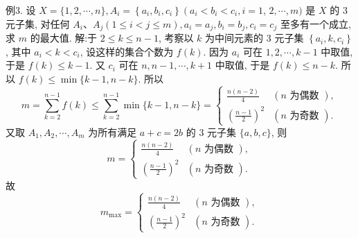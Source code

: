 例3. 设 $X=\{1,2, \cdots, n\}, A_i=\left\{a_i, b_i, c_i\right\}\left(a_i<b_i<c_i, i=1\right.$, $2, \cdots, m)$ 是 $X$ 的 3 元子集, 对任何 $A_i 、 A_j(1 \leqslant i<j \leqslant m), a_i=a_j, b_i= b_j, c_i=c_j$ 至多有一个成立, 求 $m$ 的最大值.
解:于 $2 \leqslant k \leqslant n-1$, 考察以 $k$ 为中间元素的 3 元子集 $\left\{a_i, k, c_i\right\}$, 其中 $a_i<k<c_i$, 设这样的集合个数为 $f(k)$. 因为 $a_i$ 可在 $1,2, \cdots, k-1$ 中取值, 于是 $f(k) \leqslant k-1$. 又 $c_i$ 可在 $n, n-1, \cdots, k+1$ 中取值, 于是 $f(k) \leqslant n-k$. 所以 $f(k) \leqslant \min \{k-1, n-k\}$. 所以
$$
m=\sum_{k=2}^{n-1} f(k) \leqslant \sum_{k=2}^{n-1} \min \{k-1, n-k\}= \begin{cases}\frac{n(n-2)}{4} & (n \text { 为偶数 }), \\ \left(\frac{n-1}{2}\right)^2 & (n \text { 为奇数 }) .\end{cases}
$$
又取 $A_1, A_2, \cdots, A_m$ 为所有满足 $a+c=2 b$ 的 3 元子集 $\{a, b, c\}$, 则
$$
m= \begin{cases}\frac{n(n-2)}{4} & (n \text { 为偶数 }), \\ \left(\frac{n-1}{2}\right)^2 & (n \text { 为奇数 }) .\end{cases}
$$
故
$$
m_{\max }= \begin{cases}\frac{n(n-2)}{4} & (n \text { 为偶数 }), \\ \left(\frac{n-1}{2}\right)^2 & (n \text { 为奇数 }) .\end{cases}
$$



